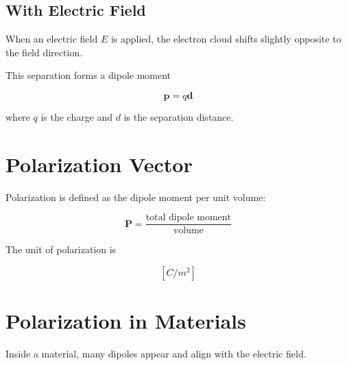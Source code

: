 \documentclass[12pt, a4paper]{article}
\begin{document}
\begin{center}
\end{center}

\subsection{With Electric Field}

When an electric field $E$ is applied, the electron cloud shifts slightly opposite to the field direction.

\begin{center}
\end{center}

This separation forms a dipole moment

\[
\mathbf{p} = q\mathbf{d}
\]

where $q$ is the charge and $d$ is the separation distance.

\section{Polarization Vector}

Polarization is defined as the dipole moment per unit volume:

\[
\mathbf{P} = \frac{\text{total dipole moment}}{\text{volume}}
\]

The unit of polarization is

\[
[C/m^2]
\]

\section{Polarization in Materials}

Inside a material, many dipoles appear and align with the electric field.
\end{document}
